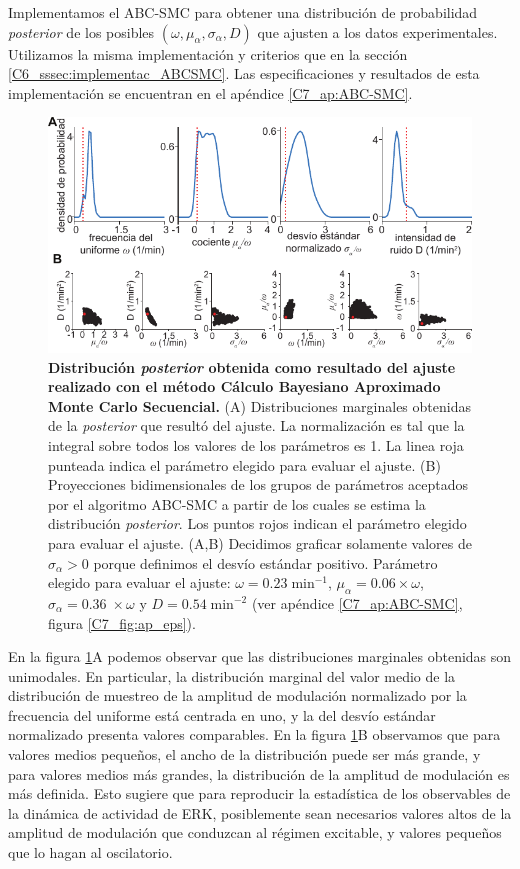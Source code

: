 \documentclass[./main.tex]{subfiles}
\begin{document}
Implementamos el ABC-SMC para obtener una distribución de probabilidad \textit{posterior} de los posibles $(\omega,\mu_{\alpha},\sigma_{\alpha},D)$ que ajusten a los datos experimentales. Utilizamos la misma implementación y criterios que en la sección \ref{C6_sssec:implementac_ABCSMC}. Las especificaciones y resultados de esta implementación se encuentran en el apéndice \ref{C7_ap:ABC-SMC}.


\begin{figure}
    \centering
    \includegraphics[width=1\columnwidth]{figures/chapter7/C7_dist_fit.pdf} 
    \caption{\textbf{Distribución \textit{posterior} obtenida como resultado del ajuste realizado con el método Cálculo Bayesiano Aproximado Monte Carlo Secuencial.} (A) Distribuciones marginales obtenidas de la \textit{posterior} que resultó del ajuste. La normalización es tal que la integral sobre todos los valores de los parámetros es 1. La linea roja punteada indica el parámetro elegido para evaluar el ajuste. (B) Proyecciones bidimensionales de los grupos de parámetros aceptados por el algoritmo ABC-SMC a partir de los cuales se estima la distribución \textit{posterior}. Los puntos rojos indican el parámetro elegido para evaluar el ajuste. (A,B) Decidimos graficar solamente valores de $\sigma_{\alpha}  > 0$ porque definimos el desvío estándar positivo. Parámetro elegido para evaluar el ajuste: $\omega = 0.23 \; \text{min}^{-1}$, $\mu_{\alpha} = 0.06 \times \omega$, $ \sigma_{\alpha} = 0.36 \;  \times \omega $ y $D = 0.54 \;\text{min}^{-2}$ (ver apéndice \ref{C7_ap:ABC-SMC}, figura \ref{C7_fig:ap_eps}).}
    \label{C7_fig:dist_fit}
\end{figure} 


En la figura \ref{C7_fig:dist_fit}A podemos observar que las distribuciones marginales obtenidas son unimodales. En particular, la distribución marginal del valor medio de la distribución de muestreo de la amplitud de modulación normalizado por la frecuencia del uniforme está centrada en uno, y la del desvío estándar normalizado presenta valores comparables. En la figura \ref{C7_fig:dist_fit}B observamos que para valores medios pequeños, el ancho de la distribución puede ser más grande, y para valores medios más grandes, la distribución de la amplitud de modulación es más definida. Esto sugiere que para reproducir la estadística de los observables de la dinámica de actividad de ERK, posiblemente sean necesarios valores altos de la amplitud de modulación que conduzcan al régimen excitable, y valores pequeños que lo hagan al oscilatorio.  
\end{document}
